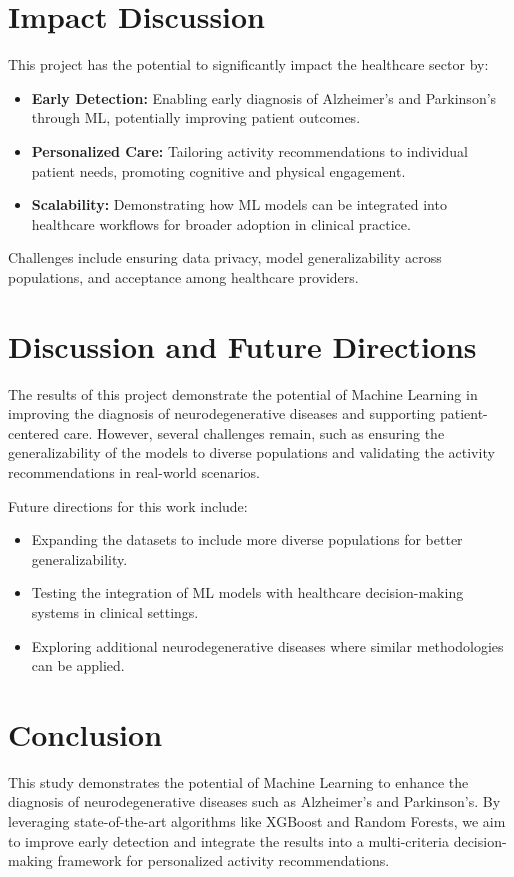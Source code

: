 \documentclass[conference]{IEEEtran}
\begin{document}
\section{Impact Discussion}
This project has the potential to significantly impact the healthcare sector by:
\begin{itemize}
    \item \textbf{Early Detection:} Enabling early diagnosis of Alzheimer’s and Parkinson’s through ML, potentially improving patient outcomes.
    \item \textbf{Personalized Care:} Tailoring activity recommendations to individual patient needs, promoting cognitive and physical engagement.
    \item \textbf{Scalability:} Demonstrating how ML models can be integrated into healthcare workflows for broader adoption in clinical practice.
\end{itemize}

Challenges include ensuring data privacy, model generalizability across populations, and acceptance among healthcare providers.

\section{Discussion and Future Directions}
The results of this project demonstrate the potential of Machine Learning in improving the diagnosis of neurodegenerative diseases and supporting patient-centered care. However, several challenges remain, such as ensuring the generalizability of the models to diverse populations and validating the activity recommendations in real-world scenarios.

Future directions for this work include:
\begin{itemize}
    \item Expanding the datasets to include more diverse populations for better generalizability.
    \item Testing the integration of ML models with healthcare decision-making systems in clinical settings.
    \item Exploring additional neurodegenerative diseases where similar methodologies can be applied.
\end{itemize}

\section{Conclusion}
This study demonstrates the potential of Machine Learning to enhance the diagnosis of neurodegenerative diseases such as Alzheimer’s and Parkinson’s. By leveraging state-of-the-art algorithms like XGBoost and Random Forests, we aim to improve early detection and integrate the results into a multi-criteria decision-making framework for personalized activity recommendations.
\end{document}
